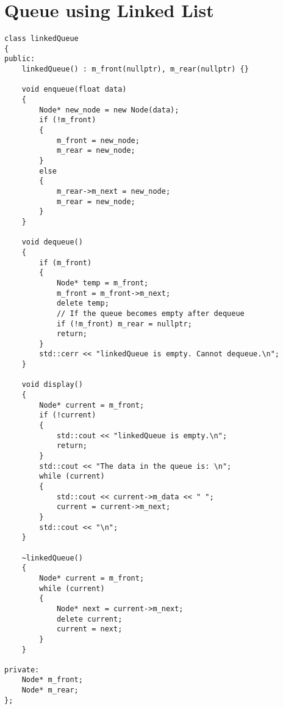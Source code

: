 \documentclass[12pt]{article}
\begin{document}
	\section*{Queue using Linked List}
	\begin{verbatim}
class linkedQueue
{
public:
    linkedQueue() : m_front(nullptr), m_rear(nullptr) {}

    void enqueue(float data)
    {
        Node* new_node = new Node(data);
        if (!m_front)
        {
            m_front = new_node;
            m_rear = new_node;
        }
        else
        {
            m_rear->m_next = new_node;
            m_rear = new_node;
        }
    }

    void dequeue()
    {
        if (m_front)
        {
            Node* temp = m_front;
            m_front = m_front->m_next;
            delete temp;
            // If the queue becomes empty after dequeue
            if (!m_front) m_rear = nullptr;
            return;
        }
        std::cerr << "linkedQueue is empty. Cannot dequeue.\n";
    }

    void display()
    {
        Node* current = m_front;
        if (!current)
        {
            std::cout << "linkedQueue is empty.\n";
            return;
        }
        std::cout << "The data in the queue is: \n";
        while (current)
        {
            std::cout << current->m_data << " ";
            current = current->m_next;
        }
        std::cout << "\n";
    }

    ~linkedQueue()
    {
        Node* current = m_front;
        while (current)
        {
            Node* next = current->m_next;
            delete current;
            current = next;
        }
    }

private:
    Node* m_front;
    Node* m_rear;
};

	\end{verbatim}

	\newpage
\end{document}
